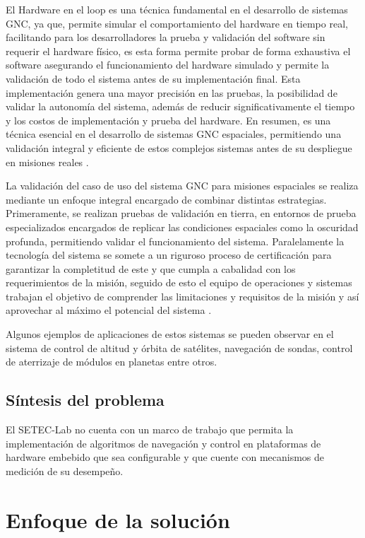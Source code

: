 \documentclass[12pt]{article}
\begin{document}
El Hardware en el loop es una técnica fundamental en el desarrollo de sistemas GNC, ya que, permite simular el comportamiento del hardware en tiempo real, facilitando para los desarrolladores la prueba y validación del software sin requerir el hardware físico, es esta forma permite probar de forma exhaustiva el software asegurando el funcionamiento del hardware simulado y permite la validación de todo el sistema antes de su implementación final. Esta implementación genera una mayor precisión en las pruebas, la posibilidad de validar la autonomía del sistema, además de reducir significativamente el tiempo y los costos de implementación y prueba del hardware. En resumen, es una técnica esencial en el desarrollo de sistemas GNC espaciales, permitiendo una validación integral y eficiente de estos complejos sistemas antes de su despliegue en misiones reales \cite{mihalivc2022hardware} \cite{montoya2020advanced}.

La validación del caso de uso del sistema GNC para misiones espaciales se realiza mediante un enfoque integral encargado de combinar distintas estrategias. Primeramente, se realizan pruebas de validación en tierra, en entornos de prueba especializados encargados de replicar las condiciones espaciales como la oscuridad profunda, permitiendo validar el funcionamiento del sistema. Paralelamente la tecnología del sistema se somete a un riguroso proceso de certificación para garantizar la completitud de este y que cumpla a cabalidad con los requerimientos de la misión, seguido de esto el equipo de operaciones y sistemas trabajan el objetivo de comprender las limitaciones y requisitos de la misión y así aprovechar al máximo el potencial del sistema \cite{gandhiterminal}.

Algunos ejemplos de aplicaciones de estos sistemas se pueden observar en el sistema de control de altitud y órbita de satélites, navegación de sondas, control de aterrizaje de módulos en planetas entre otros. 

\subsection{Síntesis del problema}

El SETEC-Lab no cuenta con un marco de trabajo que permita la implementación de algoritmos de navegación y control en plataformas de hardware embebido que sea configurable y que cuente con mecanismos de medición de su desempeño.

\section{Enfoque de la solución}
\end{document}
